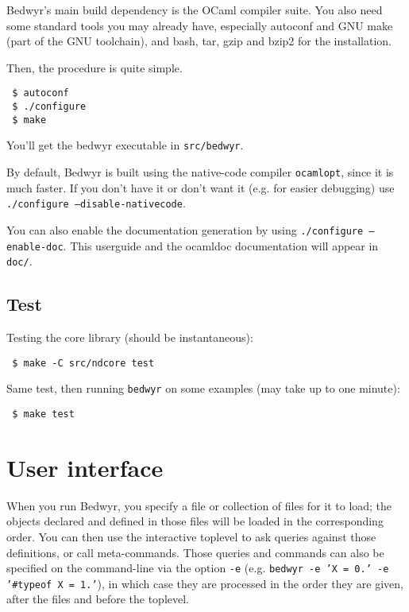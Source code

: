 \documentclass{article}
\begin{document}
Bedwyr's main build dependency is the OCaml compiler suite.
You also need some standard tools you may already have, especially
autoconf and GNU make (part of the GNU toolchain),
and bash, tar, gzip and bzip2 for the installation.

Then, the procedure is quite simple.

\begin{verbatim}
 $ autoconf
 $ ./configure
 $ make
\end{verbatim}

You'll get the bedwyr executable in \texttt{src/bedwyr}.

By default, Bedwyr is built using the native-code compiler \texttt{ocamlopt},
since it is much faster. If you don't have it or don't want it (e.g.
for easier debugging) use \texttt{./configure --disable-nativecode}.

You can also enable the documentation generation by using
\texttt{./configure --enable-doc}. This userguide and the ocamldoc
documentation will appear in \texttt{doc/}.

\subsection{Test}

Testing the core library (should be instantaneous):
\begin{verbatim}
 $ make -C src/ndcore test
\end{verbatim}
Same test, then running {\tt bedwyr} on some examples (may take up to
one minute):
\begin{verbatim}
 $ make test
\end{verbatim}


\section{User interface}

When you run Bedwyr, you specify a file or collection of files for it to
load; the objects declared and defined in those files will be loaded in
the corresponding order. You can then use the interactive toplevel to
ask queries against those definitions, or call meta-commands.
Those queries and commands can also be specified on the command-line via
the option \verb.-e. (e.g.
\texttt{bedwyr -e 'X = 0.' -e '\#typeof X = 1.'}), in which case they are
processed in the order they are given, after the files and before the
toplevel.
\end{document}
